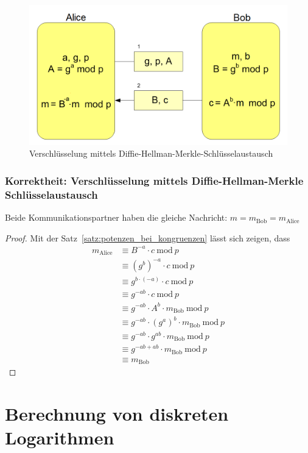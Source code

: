\documentclass[
  a4paper,
  11pt,
]{scrartcl}
\theoremstyle{plain}
\theoremstyle{definition}
\theoremstyle{remark}
\newcommand{\Mod}[1]{\ \mathrm{mod}\ #1}
\begin{document}
\begin{figure}[H]
  \centering
  \includegraphics[width=\textwidth]{DHKE_enc.png}
  \caption{Verschlüsselung mittels Diffie-Hellman-Merkle-Schlüsselaustausch}
  \label{fig:enc_with_dhke}
\end{figure}

\subsubsection{Korrektheit: Verschlüsselung mittels Diffie-Hellman-Merkle Schlüsselaustausch}
\label{sub:enc_with_dhke_proof}
Beide Kommunikationspartner haben die gleiche Nachricht: $m = m_{\text{Bob}} = m_{\text{Alice}}$
\begin{proof}
	Mit der Satz~\ref{satz:potenzen_bei_kongruenzen} lässt sich zeigen, dass
	\begin{align*}
      m_{\text{Alice}} & \equiv B^{-a} \cdot c \Mod{p}\\
      & \equiv (g^b)^{-a} \cdot c \Mod{p}\\
      & \equiv g^{b \cdot (-a)} \cdot c \Mod{p}\\
      & \equiv g^{-ab} \cdot c \Mod{p}\\
      & \equiv g^{-ab} \cdot A^b \cdot m_{\text{Bob}} \Mod{p}\\
      & \equiv g^{-ab} \cdot (g^a)^b \cdot m_{\text{Bob}} \Mod{p}\\
      & \equiv g^{-ab} \cdot g^{ab} \cdot m_{\text{Bob}} \Mod{p}\\
      & \equiv g^{-ab+ab} \cdot m_{\text{Bob}} \Mod{p}\\
      & \equiv m_{\text{Bob}}
    \end{align*}
\end{proof}

\section{Berechnung von diskreten Logarithmen}
\label{sec:berechnung_von_diskreten_logarithmen}
\end{document}
